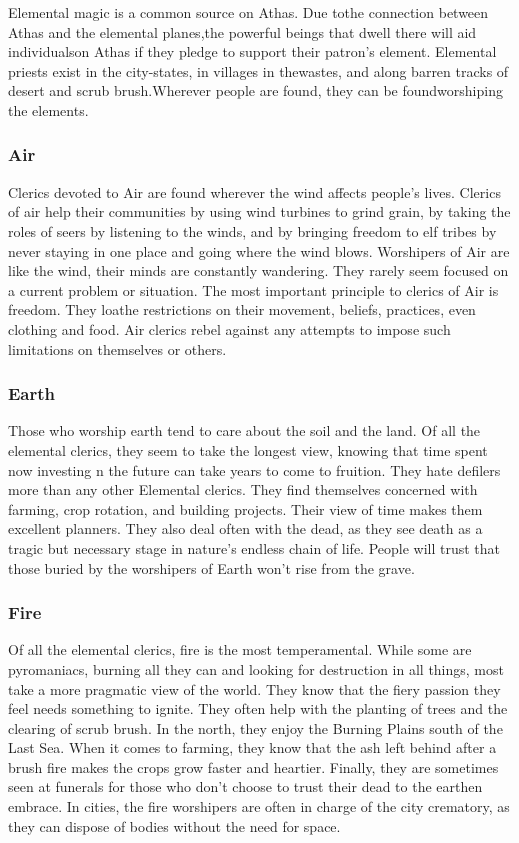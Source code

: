 Elemental magic is a common source on Athas. Due tothe connection between Athas and the elemental planes,the powerful beings that dwell there will aid individualson Athas if they pledge to support their patron's element. Elemental priests exist in the city-states, in villages in thewastes, and along barren tracks of desert and scrub brush.Wherever people are found, they can be foundworshiping the elements.

\subsubsection{Air}
Clerics devoted to Air are found wherever the wind affects people's lives. Clerics of air help their communities by using wind turbines to grind grain, by taking the roles of seers by listening to the winds, and by bringing freedom to elf tribes by never staying in one place and going where the wind blows. Worshipers of Air are like the wind, their minds are constantly wandering. They rarely seem focused on a current problem or situation. The most important principle to clerics of Air is freedom. They loathe restrictions on their movement, beliefs, practices, even clothing and food. Air clerics rebel against any attempts to impose such limitations on themselves or others.

\subsubsection{Earth}
Those who worship earth tend to care about the soil and the land. Of all the elemental clerics, they seem to take the longest view, knowing that time spent now investing n the future can take years to come to fruition. They hate defilers more than any other Elemental clerics. They find themselves concerned with farming, crop rotation, and building projects. Their view of time makes them excellent planners. They also deal often with the dead, as they see death as a tragic but necessary stage in nature's endless chain of life. People will trust that those buried by the worshipers of Earth won't rise from the grave.

\subsubsection{Fire}
Of all the elemental clerics, fire is the most temperamental. While some are pyromaniacs, burning all they can and looking for destruction in all things, most take a more pragmatic view of the world. They know that the fiery passion they feel needs something to ignite. They often help with the planting of trees and the clearing of scrub brush. In the north, they enjoy the Burning Plains south of the Last Sea. When it comes to farming, they know that the ash left behind after a brush fire makes the crops grow faster and heartier. Finally, they are sometimes seen at funerals for those who don't choose to trust their dead to the earthen embrace. In cities, the fire worshipers are often in charge of the city crematory, as they can dispose of bodies without the need for space.

